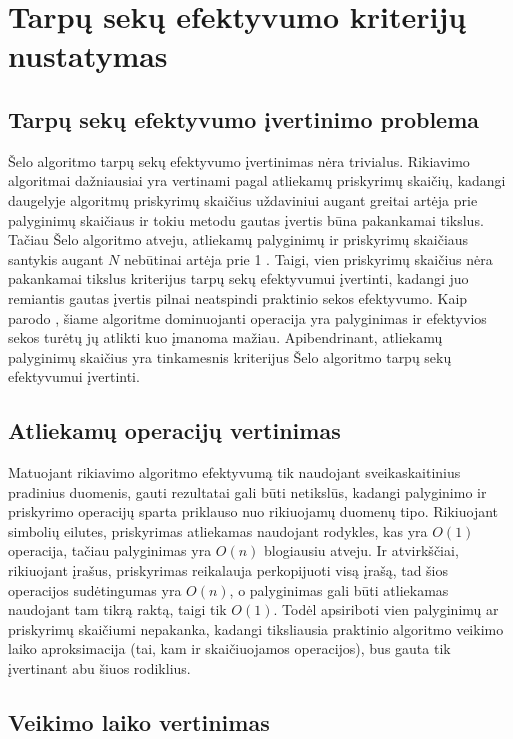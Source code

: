 \documentclass{VUMIFInfKursinis}
\begin{document}
\section{Tarpų sekų efektyvumo kriterijų nustatymas}

\subsection{Tarpų sekų efektyvumo įvertinimo problema}

Šelo algoritmo tarpų sekų efektyvumo įvertinimas nėra trivialus.
Rikiavimo algoritmai dažniausiai yra vertinami pagal atliekamų priskyrimų skaičių, kadangi
daugelyje algoritmų priskyrimų skaičius uždaviniui augant greitai artėja prie palyginimų skaičiaus ir
tokiu metodu gautas įvertis būna pakankamai tikslus.
Tačiau Šelo algoritmo atveju, atliekamų palyginimų ir priskyrimų skaičiaus santykis augant $N$ nebūtinai artėja prie 1 \cite{Radavičius_Baranauskas_2013}.
Taigi, vien priskyrimų skaičius nėra pakankamai tikslus kriterijus tarpų sekų efektyvumui įvertinti,
kadangi juo remiantis gautas įvertis pilnai neatspindi praktinio sekos efektyvumo.
Kaip parodo \cite{ciura2001best}, šiame algoritme dominuojanti operacija yra palyginimas ir efektyvios sekos
turėtų jų atlikti kuo įmanoma mažiau.
Apibendrinant, atliekamų palyginimų skaičius yra tinkamesnis kriterijus Šelo algoritmo tarpų sekų efektyvumui įvertinti.

\subsection{Atliekamų operacijų vertinimas}

Matuojant rikiavimo algoritmo efektyvumą tik naudojant sveikaskaitinius pradinius duomenis, gauti rezultatai gali būti netikslūs,
kadangi palyginimo ir priskyrimo operacijų sparta priklauso nuo rikiuojamų duomenų tipo.
Rikiuojant simbolių eilutes, priskyrimas atliekamas naudojant rodykles, kas yra $O(1)$ operacija,
tačiau palyginimas yra $O(n)$ blogiausiu atveju.
Ir atvirkščiai, rikiuojant įrašus, priskyrimas reikalauja perkopijuoti visą įrašą, tad šios operacijos sudėtingumas yra $O(n)$,
o palyginimas gali būti atliekamas naudojant tam tikrą raktą, taigi tik $O(1)$.
Todėl apsiriboti vien palyginimų ar priskyrimų skaičiumi nepakanka, kadangi tiksliausia praktinio algoritmo
veikimo laiko aproksimacija (tai, kam ir skaičiuojamos operacijos), bus gauta tik įvertinant abu šiuos rodiklius.

\subsection{Veikimo laiko vertinimas}
\end{document}
